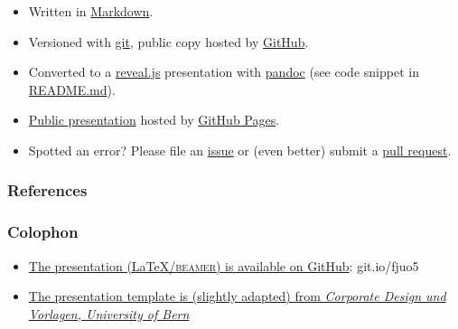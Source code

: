 \documentclass[handout,aspectratio=169,10pt]{beamer}
\begin{document}
\begin{frame}

\begin{itemize}
	\item Written in \href{https://daringfireball.net/projects/markdown/}{Markdown}.
	\item Versioned with \href{https://git-scm.com/}{git}, public copy hosted by
  \href{https://github.com/habi/lecture_microtomography/}{GitHub}.
	\item Converted to a \href{https://revealjs.com/}{reveal.js} presentation with \href{https://pandoc.org/}{pandoc} (see code snippet in \href{https://github.com/habi/lecture_microtomography/blob/master/README.md}{README.md}).
	\item \href{http://habi.github.io/lecture_microtomography}{Public presentation} hosted by \href{https://pages.github.com/}{GitHub Pages}.
	\item Spotted an error? Please file an \href{https://github.com/habi/lecture_microtomography/issues}{issue} or (even better) submit a \href{https://github.com/habi/lecture_microtomography/pulls}{pull request}.
\end{itemize}
\end{frame}

\begin{frame}
	\frametitle{References}
	\renewcommand*{\bibfont}{\scriptsize}
	\printbibliography
\end{frame}

\begin{frame}
	\frametitle{Colophon}
	\begin{itemize}
		\item \href{https://github.com/habi/20190605_BrukerUserMeeting}{The presentation (\LaTeX/\textsc{beamer}) is available on GitHub}: git.io/fjuo5
		\item \href{http://intern.unibe.ch/dienstleistungen/corporate_design_und_vorlagen/praesentationen/index_ger.html}{The presentation template is (slightly adapted) from \emph{Corporate Design und Vorlagen, University of Bern}}
	\end{itemize}
\end{frame}
\end{document}
